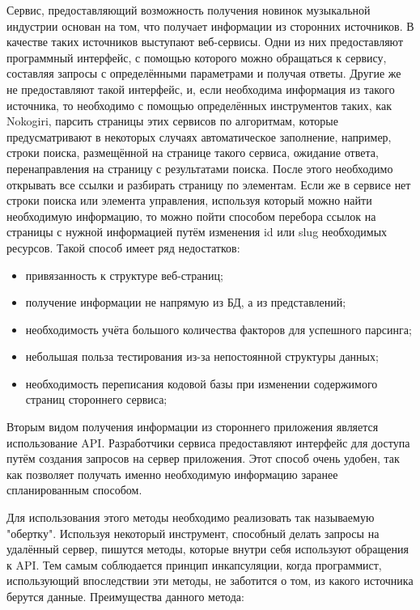 Сервис, предоставляющий возможность получения новинок музыкальной индустрии основан на том, что получает информации из сторонних источников. В качестве таких источников выступают веб-сервисы. Одни из них предоставляют программный интерфейс, с помощью которого можно обращаться к сервису, составляя запросы с определёнными параметрами и получая ответы. Другие же не предоставляют такой интерфейс, и, если необходима информация из такого источника, то необходимо с помощью определённых инструментов таких, как Nokogiri, парсить страницы этих сервисов по алгоритмам, которые предусматривают в некоторых случаях автоматическое заполнение, например, строки поиска, размещённой на странице такого сервиса, ожидание ответа, перенаправления на страницу с результатами поиска. После этого необходимо открывать все ссылки и разбирать страницу по элементам. Если же в сервисе нет строки поиска или элемента управления, используя который можно найти необходимую информацию, то можно пойти способом перебора ссылок на страницы с нужной информацией путём изменения id или slug необходимых ресурсов. Такой способ имеет ряд недостатков:

\begin{itemize}
  \item привязанность к структуре веб-страниц;
  \item получение информации не напрямую из БД, а из представлений;
  \item необходимость учёта большого количества факторов для успешного парсинга;
  \item небольшая польза тестирования из-за непостоянной структуры данных;
  \item необходимость переписания кодовой базы при изменении содержимого страниц стороннего сервиса;
\end{itemize}

Вторым видом получения информации из стороннего приложения является использование API. Разработчики сервиса предоставляют интерфейс для доступа путём создания запросов на сервер приложения. Этот способ очень удобен, так как позволяет получать именно необходимую информацию заранее спланированным способом.

Для использования этого методы необходимо реализовать так называемую "обертку". Используя некоторый инструмент, способный делать запросы на удалённый сервер, пишутся методы, которые внутри себя используют обращения к API. Тем самым соблюдается принцип инкапсуляции, когда программист, использующий впоследствии эти методы, не заботится о том, из какого источника берутся данные. Преимущества данного метода:

